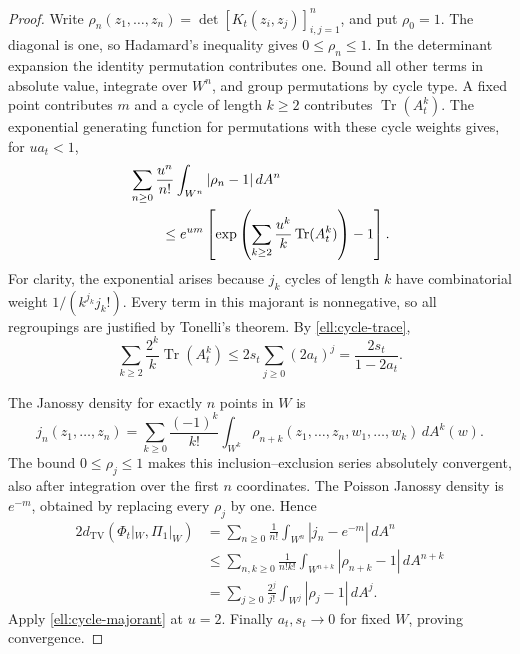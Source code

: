 \documentclass[11pt,a4paper]{article}
\theoremstyle{definition}
\theoremstyle{remark}
\numberwithin{equation}{section}
\begin{document}
\begin{proof}
Write
$\rho_n(z_1,\ldots,z_n)=\det[K_t(z_i,z_j)]_{i,j=1}^n$,
and put $\rho_0=1$.  The diagonal is one, so Hadamard's
inequality gives $0\le\rho_n\le1$.  In the determinant
expansion the identity permutation contributes one.  Bound all
other terms in absolute value, integrate over $W^n$, and group
permutations by cycle type.  A fixed point contributes $m$ and
a cycle of length $k\ge2$ contributes
$\operatorname{Tr}(A_t^k)$.  The exponential generating function
for permutations with these cycle weights gives, for $u a_t<1$,
\begin{align}
 &\sum_{n\ge0}\frac{u^n}{n!}
       \int_{W^n}|\rho_n-1|\,dA^n\notag\\
 &\hspace{8mm}\le
 e^{um}\left[
   \exp\left(\sum_{k\ge2}\frac{u^k}{k}
                           \operatorname{Tr}(A_t^k)\right)-1
             \right].\label{ell:cycle-majorant}
\end{align}
For clarity, the exponential arises because $j_k$ cycles of
length $k$ have combinatorial weight $1/(k^{j_k}j_k!)$.
Every term in this majorant is nonnegative, so all regroupings
are justified by Tonelli's theorem.  By \eqref{ell:cycle-trace},
\[
 \sum_{k\ge2}\frac{2^k}{k}\operatorname{Tr}(A_t^k)
 \le 2s_t\sum_{j\ge0}(2a_t)^j
 =\frac{2s_t}{1-2a_t}.
\]

The Janossy density for exactly $n$ points in $W$ is
\begin{equation}\label{ell:janossy}
 j_n(z_1,\ldots,z_n)
 =\sum_{k\ge0}\frac{(-1)^k}{k!}
       \int_{W^k}\rho_{n+k}(z_1,\ldots,z_n,w_1,\ldots,w_k)
                 \,dA^k(w).
\end{equation}
The bound $0\le\rho_j\le1$ makes this inclusion--exclusion
series absolutely convergent, also after integration over the
first $n$ coordinates.  The Poisson Janossy density is $e^{-m}$,
obtained by replacing every $\rho_j$ by one.  Hence
\begin{align*}
 2d_{\mathrm{TV}}(\Phi_t|_W,\Pi_1|_W)
 &=\sum_{n\ge0}\frac1{n!}\int_{W^n}|j_n-e^{-m}|\,dA^n\\
 &\le\sum_{n,k\ge0}\frac1{n!k!}
                         \int_{W^{n+k}}|\rho_{n+k}-1|\,dA^{n+k}\\
 &=\sum_{j\ge0}\frac{2^j}{j!}
                         \int_{W^j}|\rho_j-1|\,dA^j.
\end{align*}
Apply \eqref{ell:cycle-majorant} at $u=2$.  Finally
$a_t,s_t\to0$ for fixed $W$, proving convergence.
\end{proof}
\end{document}
